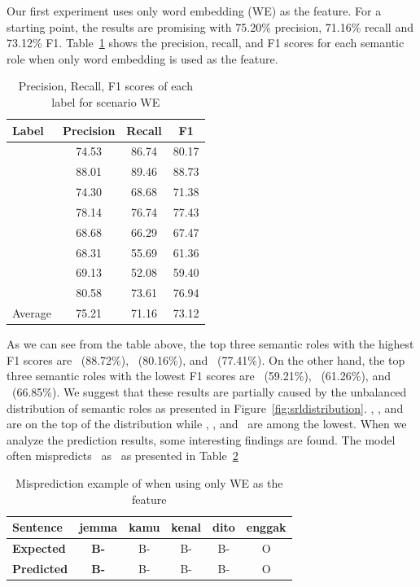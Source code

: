 Our first experiment uses only word embedding (WE) as the feature. For a starting point, the results are promising with 75.20\% precision, 71.16\% recall and 73.12\% F1. Table~\ref{tab:ex11srl} shows the precision, recall, and F1 scores for each semantic role when only word embedding is used as the feature.

\begin{table}
	\centering
	\caption{Precision, Recall, F1 scores of each label for scenario WE}
	\label{tab:ex11srl}
	\begin{tabular}{lccc}
		\hline
		Label & Precision & Recall & F1 \\
		\hline\hline
		\agent & 74.53 & 86.74 & 80.17 \\
		\predicate & 88.01 & 89.46 & 88.73 \\
		\patient & 74.30 & 68.68 & 71.38 \\
		\modal & 78.14 & 76.74 & 77.43 \\
		\beneficiary & 68.68 & 66.29 & 67.47 \\
		\location & 68.31 & 55.69 & 61.36 \\
		\greet & 69.13 & 52.08 & 59.40 \\
		\timesrl & 80.58 & 73.61 & 76.94 \\
		\hline
		Average & 75.21 & 71.16 & 73.12\\
		\hline
	\end{tabular}

\end{table}


As we can see from the table above, the top three semantic roles with the highest F1 scores are \predicate~(88.72\%), \agent~(80.16\%), and \modal~(77.41\%). On the other hand, the top three semantic roles with the lowest F1 scores are \greet~(59.21\%), \location~(61.26\%), and \beneficiary~(66.85\%). We suggest that these results are partially caused by the unbalanced distribution of semantic roles as presented in Figure~\ref{fig:srldistribution}. \predicate, \agent, and \modal~ are on the top of the distribution while \greet, \location, and \beneficiary~are among the lowest. When we analyze the prediction results, some interesting findings are found. The model often mispredicts \greet~as \agent~as presented in Table~\ref{tab:contohgreetagent}

\begin{table}
	\centering
	\caption{Misprediction example of \greet when using only WE as the feature}
	\label{tab:contohgreetagent}
	\begin{tabular}{|l|ccccc|}
		\hline
		\textbf{Sentence} 				& jemma & kamu & kenal & dito & enggak \\
		\hline
		\textbf{Expected}				& \textbf{B-\greet} & B-\agent & B-\predicate & B-\patient  & O\\
		\hline
		\textbf{Predicted}		& \textbf{B-\agent} & B-\agent & B-\predicate & B-\patient  & O\\
		\hline
	\end{tabular}
\end{table}

